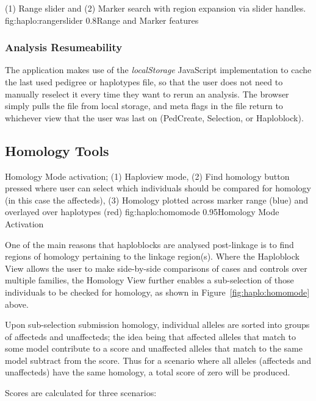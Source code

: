 	{(1) Range slider and (2) Marker search with region expansion via slider handles.}
	{fig:haplo:rangerslider}
	{0.8}{Range and Marker features}

\subsubsection{Analysis Resumeability}

The application makes use of the \textit{localStorage} JavaScript implementation to cache the last used pedigree or haplotypes file, so that the user does not need to manually reselect it every time they want to rerun an analysis. The browser simply pulls the file from local storage, and meta flags in the file return to whichever view that the user was last on (PedCreate, Selection, or Haploblock).

\subsection{Homology Tools}

	{Homology Mode activation; (1) Haploview mode, (2) Find homology button pressed where user can select which individuals should be compared for homology (in this case the affecteds), (3) Homology plotted across marker range (blue) and overlayed over haplotypes (red)}
	{fig:haplo:homomode}
	{0.95}{Homology Mode Activation}


One of the main reasons that haploblocks are analysed post-linkage is to find regions of homology pertaining to the linkage region(s). Where the Haploblock View allows the user to make side-by-side comparisons of cases and controls over multiple families, the Homology View further enables a sub-selection of those individuals to be checked for homology, as shown in Figure~\ref{fig:haplo:homomode} above.

Upon sub-selection submission homology, individual alleles are sorted into groups of affecteds and unaffecteds; the idea being that affected alleles that match to some model contribute to a score and unaffected alleles that match to the same model subtract from the score. Thus for a scenario where all alleles (affecteds and unaffecteds) have the same homology, a total score of zero will be produced. 

Scores are calculated for three scenarios:
\begin{enumerate}
\end{enumerate}

